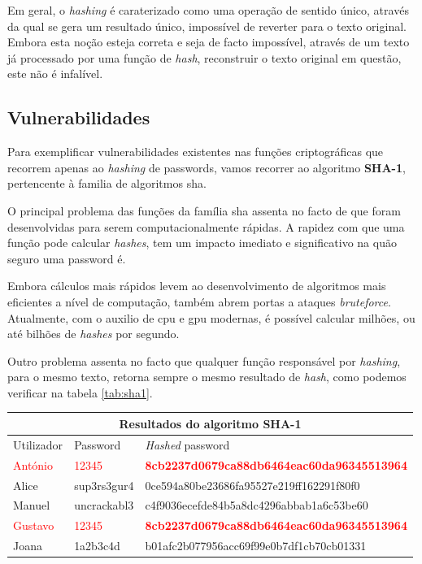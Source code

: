 Em geral, o \emph{hashing} é caraterizado como uma operação de sentido único, através da qual se gera um resultado único, impossível de reverter para o texto original.
Embora esta noção esteja correta e seja de facto impossível, através de um texto já processado por uma função de \emph{hash}, reconstruir o texto original em questão, este não é infalível.

\subsection{Vulnerabilidades} \label{vulnerabilidades}

Para exemplificar vulnerabilidades existentes nas funções criptográficas que recorrem apenas ao \emph{hashing} de passwords, vamos recorrer ao algoritmo \textbf{SHA-1}, pertencente à familia de algoritmos \gls{sha}.

O principal problema das funções da família \gls{sha} assenta no facto de que foram desenvolvidas para serem computacionalmente rápidas. A rapidez com que uma função pode calcular \emph{hashes}, tem um impacto imediato e significativo na quão seguro uma password é.

Embora cálculos mais rápidos levem ao desenvolvimento de algoritmos mais eficientes a nível de computação, também abrem portas a ataques \emph{bruteforce}. Atualmente, com o auxilio de \gls{cpu} e \gls{gpu} modernas, é possível calcular milhões, ou até bilhões de \emph{hashes} por segundo.

Outro problema assenta no facto que qualquer função responsável por \emph{hashing}, para o mesmo texto, retorna sempre o mesmo resultado de \emph{hash}, como podemos verificar na tabela \ref{tab:sha1}.

\begin{center}
    \begin{tabular}{ |p{2cm}|p{2.5cm}|p{8.5cm}|  }
        \hline
        \multicolumn{3}{|c|}{Resultados do algoritmo SHA-1} \\
        \hline
        Utilizador & Password & \emph{Hashed} password\\
        \hline
        \textcolor{red}{António} & \textcolor{red}{12345} & \textcolor{red}{\textbf{8cb2237d0679ca88db6464eac60da96345513964}}\\
        Alice & sup3rs3gur4 & 0ce594a80be23686fa95527e219ff162291f80f0\\
        Manuel & uncrackabl3 & c4f9036ecefde84b5a8dc4296abbab1a6c53be60\\
        \textcolor{red}{Gustavo} & \textcolor{red}{12345} & \textcolor{red}{\textbf{8cb2237d0679ca88db6464eac60da96345513964}}\\
        Joana & 1a2b3c4d & b01afc2b077956acc69f99e0b7df1cb70cb01331\\
        \hline
    \end{tabular}
\label{tab:sha1} 
\end{center}

